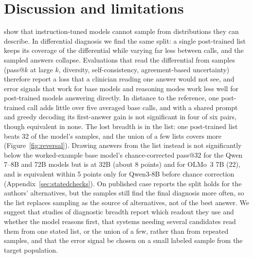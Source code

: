 \documentclass[wcp]{jmlr}
\begin{document}
\section{Discussion and limitations}
\citet{jang2026cannotsample} show that instruction-tuned models cannot sample from distributions they can describe. In differential diagnosis we find the same split: a single post-trained list keeps its coverage of the differential while varying far less between calls, and the sampled answers collapse. Evaluations that read the differential from samples (pass@$k$ at large $k$, diversity, self-consistency, agreement-based uncertainty) therefore report a loss that a clinician reading one answer would not see, and error signals that work for base models and reasoning modes work less well for post-trained models answering directly. In distance to the reference, one post-trained call adds little over five averaged base calls, and with a shared prompt and greedy decoding its first-answer gain is not significant in four of six pairs, though equivalent in none. The lost breadth is in the list: one post-trained list beats 32 of the model's samples, and the union of a few lists covers more (Figure~\ref{fig:reversal}). Drawing answers from the list instead is not significantly below the worked-example base model's chance-corrected pass@32 for the Qwen 7--8B and 72B models but is at 32B (about 8 points) and for OLMo~3 7B (22), and is equivalent within 5 points only for Qwen3-8B before chance correction (Appendix~\ref{sec:statedchecks}). On published case reports the split holds for the authors' alternatives, but the samples still find the final diagnosis more often, so the list replaces sampling as the source of alternatives, not of the best answer.
We suggest that studies of diagnostic breadth report which readout they use and whether the model reasons first, that systems needing several candidates read them from one stated list, or the union of a few, rather than from repeated samples, and that the error signal be chosen on a small labeled sample from the target population.
\end{document}
